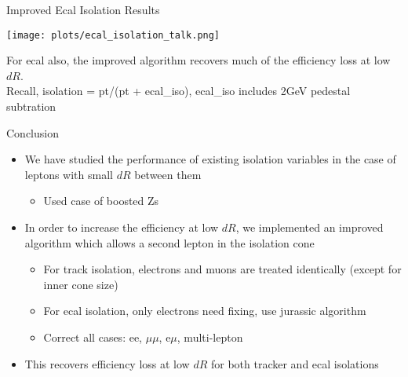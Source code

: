 \documentclass{beamer}
\begin{document}
\begin{frame}{Improved Ecal Isolation Results}
  \begin{center}

    \vspace{-0.25cm}
    \texttt{[image: plots/ecal\_isolation\_talk.png]}

    \footnotesize For ecal also, the improved algorithm recovers much of the efficiency loss at low $dR$. \\
    Recall, isolation = pt/(pt + ecal\_iso), ecal\_iso includes 2GeV pedestal subtration
  \end{center}
\end{frame}


\begin{frame}{Conclusion}
  \begin{itemize}
  \item We have studied the performance of existing isolation variables in the case of leptons with small $dR$ between them
    \begin{itemize}
    \item Used case of boosted Zs
    \end{itemize}
  \item In order to increase the efficiency at low $dR$, we implemented an improved algorithm which allows a second lepton in the isolation cone
    \begin{itemize}
    \item For track isolation, electrons and muons are treated identically (except for inner cone size)
    \item For ecal isolation, only electrons need fixing, use jurassic algorithm
    \item Correct all cases: ee, $\mu\mu$, e$\mu$, multi-lepton
    \end{itemize}
  \item This recovers efficiency loss at low $dR$ for both tracker and ecal isolations
  \end{itemize}
\end{frame}
\end{document}
